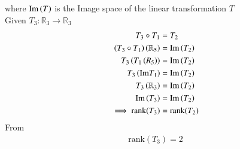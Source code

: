 \documentclass[journal]{IEEEtran}
\begin{document}
where $\text{Im}\left(T\right)$ is the Image space of the linear transformation $T$ \\
Given $T_3 : \mathbb{R}_3 \rightarrow \mathbb{R}_3 $ 
\begin{align}
    T_3 \circ T_1 &= T_2\\
   \left( T_3 \circ T_1\right)\left(\mathbb{R}_5\right) &= \text{Im}\left(T_2\right) \\
   T_3 \left(T_1\left(R_5\right)\right) &= \text{Im}\left(T_2\right) \\
   T_3 \left(\text{Im}T_1\right) &= \text{Im}\left(T_2\right) \\
   T_3 \left(\mathbb{R}_3\right) &= \text{Im}\left(T_2\right) \\
   \text{Im}\left(T_3\right) &= \text{Im}\left(T_2\right) \\
   \implies  \text{rank}(T_3) &= \text{rank}(T_2)
\end{align}
From 
\begin{align}
    \text{rank}(T_3)=2
\end{align}
 
\end{document}
